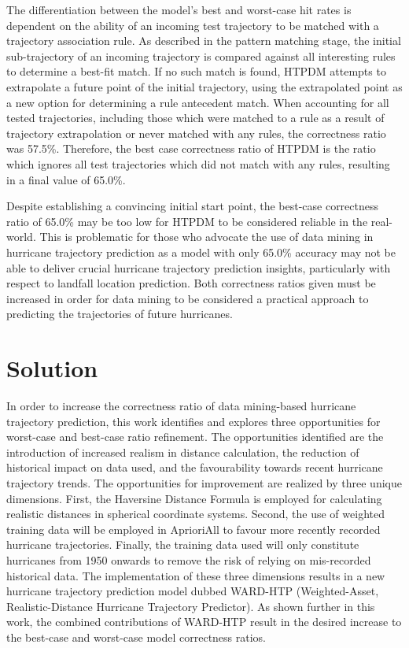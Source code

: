 \documentclass[12pt,conference]{IEEEtran}
\begin{document}
The differentiation between the model's best and worst-case hit rates is dependent on the ability of an incoming test trajectory to be matched with a trajectory association rule. As described in the pattern matching stage, the initial sub-trajectory of an incoming trajectory is compared against all interesting rules to determine a best-fit match. If no such match is found, HTPDM attempts to extrapolate a future point of the initial trajectory, using the extrapolated point as a new option for determining a rule antecedent match. When accounting for all tested trajectories, including those which were matched to a rule as a result of trajectory extrapolation or never matched with any rules, the correctness ratio was 57.5\%. Therefore, the best case correctness ratio of HTPDM is the ratio which ignores all test trajectories which did not match with any rules, resulting in a final value of 65.0\%.

Despite establishing a convincing initial start point, the best-case correctness ratio of 65.0\% may be too low for HTPDM to be considered reliable in the real-world. This is problematic for those who advocate the use of data mining in hurricane trajectory prediction as a model with only 65.0\% accuracy may not be able to deliver crucial hurricane trajectory prediction insights, particularly with respect to landfall location prediction. Both correctness ratios given must be increased in order for data mining to be considered a practical approach to predicting the trajectories of future hurricanes.

\section{Solution}

In order to increase the correctness ratio of data mining-based hurricane trajectory prediction, this work identifies and explores three opportunities for worst-case and best-case ratio refinement. The opportunities identified are the introduction of increased realism in distance calculation, the reduction of historical impact on data used, and the favourability towards recent hurricane trajectory trends. The opportunities for improvement are realized by three unique dimensions. First, the Haversine Distance Formula is employed for calculating realistic distances in spherical coordinate systems. Second, the use of weighted training data will be employed in AprioriAll to favour more recently recorded hurricane trajectories. Finally, the training data used will only constitute hurricanes from 1950 onwards to remove the risk of relying on mis-recorded historical data. The implementation of these three dimensions results in a new hurricane trajectory prediction model dubbed WARD-HTP (Weighted-Asset, Realistic-Distance Hurricane Trajectory Predictor). As shown further in this work, the combined contributions of WARD-HTP result in the desired increase to the best-case and worst-case model correctness ratios.
\end{document}
